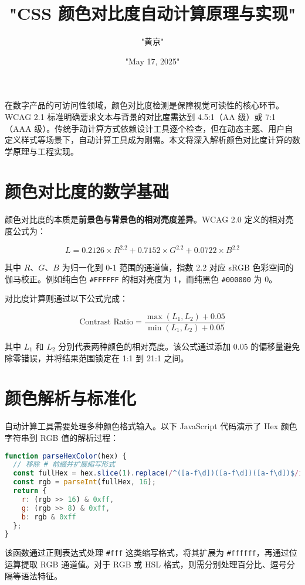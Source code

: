 \title{"CSS 颜色对比度自动计算原理与实现"}
\author{"黄京"}
\date{"May 17, 2025"}
\maketitle
在数字产品的可访问性领域，颜色对比度检测是保障视觉可读性的核心环节。WCAG 2.1 标准明确要求文本与背景的对比度需达到 4.5:1（AA 级）或 7:1（AAA 级）。传统手动计算方式依赖设计工具逐个检查，但在动态主题、用户自定义样式等场景下，自动计算工具成为刚需。本文将深入解析颜色对比度计算的数学原理与工程实现。\par
\chapter{颜色对比度的数学基础}
颜色对比度的本质是\textbf{前景色与背景色的相对亮度差异}。WCAG 2.0 定义的相对亮度公式为：\par
$$ L = 0.2126 \times R^{2.2} + 0.7152 \times G^{2.2} + 0.0722 \times B^{2.2} $$\par
其中 $R$、$G$、$B$ 为归一化到 0-1 范围的通道值，指数 2.2 对应 sRGB 色彩空间的伽马校正。例如纯白色 \verb!#FFFFFF! 的相对亮度为 1，而纯黑色 \verb!#000000! 为 0。\par
对比度计算则通过以下公式完成：\par
$$ \text{Contrast Ratio} = \frac{\max(L_1, L_2) + 0.05}{\min(L_1, L_2) + 0.05} $$\par
其中 $L_1$ 和 $L_2$ 分别代表两种颜色的相对亮度。该公式通过添加 0.05 的偏移量避免除零错误，并将结果范围锁定在 1:1 到 21:1 之间。\par
\chapter{颜色解析与标准化}
自动计算工具需要处理多种颜色格式输入。以下 JavaScript 代码演示了 Hex 颜色字符串到 RGB 值的解析过程：\par
\begin{lstlisting}[language=javascript]
function parseHexColor(hex) {
  // 移除 # 前缀并扩展缩写形式
  const fullHex = hex.slice(1).replace(/^([a-f\d])([a-f\d])([a-f\d])$/i, '$1$1$2$2$3$3');
  const rgb = parseInt(fullHex, 16);
  return {
    r: (rgb >> 16) & 0xff,
    g: (rgb >> 8) & 0xff,
    b: rgb & 0xff
  };
}
\end{lstlisting}
该函数通过正则表达式处理 \verb!#fff! 这类缩写格式，将其扩展为 \verb!#ffffff!，再通过位运算提取 RGB 通道值。对于 RGB 或 HSL 格式，则需分别处理百分比、逗号分隔等语法特征。\par
